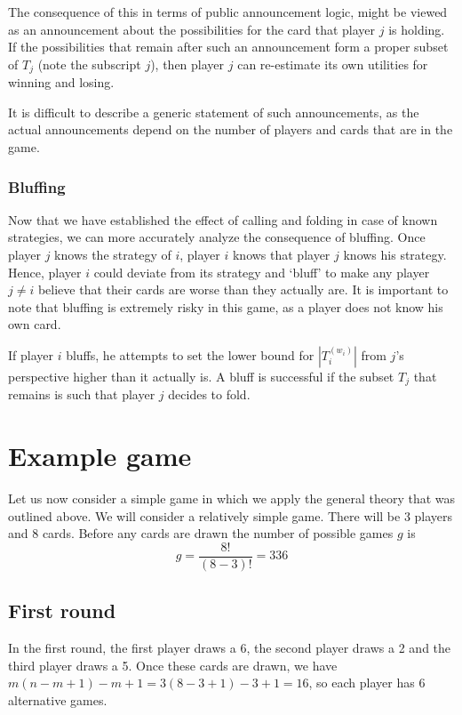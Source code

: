 \documentclass[a4paper,10pt]{article}
\begin{document}
The consequence of this in terms of public announcement logic, might be viewed as an announcement about the possibilities for the card that player $j$ is holding. If the possibilities that remain after such an announcement form a proper subset of $T_j$ (note the subscript $j$), then player $j$ can re-estimate its own utilities for winning and losing.

It is difficult to describe a generic statement of such announcements, as the actual announcements depend on the number of players and cards that are in the game.

\subsubsection{Bluffing}
Now that we have established the effect of calling and folding in case of known strategies, we can more accurately analyze the consequence of bluffing. Once player $j$ knows the strategy of $i$, player $i$ knows that player $j$ knows his strategy. Hence, player $i$ could deviate from its strategy and `bluff' to make any player $j\neq i$ believe that their cards are worse than they actually are. It is important to note that bluffing is extremely risky in this game, as a player does not know his own card.

If player $i$ bluffs, he attempts to set the lower bound for $|T^{(w_i)}_i|$ from $j$'s perspective higher than it actually is. A bluff is successful if the subset $T_j$ that remains is such that player $j$ decides to fold.

\section{Example game}
Let us now consider a simple game in which we apply the general theory that was outlined above. We will consider a relatively simple game. There will be 3 players and 8 cards. Before any cards are drawn the number of possible games $g$ is 
\begin{equation}
 g=\frac{8!}{(8-3)!}=336
\end{equation}

\subsection{First round}
In the first round, the first player draws a 6, the second player draws a 2 and the third player draws a 5. Once these cards are drawn, we have $m(n-m+1) - m +1 = 3(8-3+1) - 3 + 1=16$, so each player has 6 alternative games.
\end{document}
